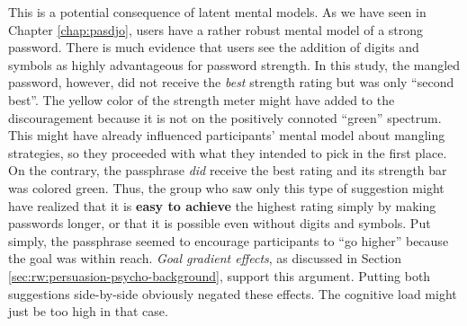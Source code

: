 This is a potential consequence of latent mental models. As we have seen in Chapter \ref{chap:pasdjo}, users have a rather robust mental model of a strong password. There is much evidence that users see the addition of digits and symbols as highly advantageous for password strength. In this study, the mangled password, however, did not receive the \textit{best} strength rating but was only ``second best''. The yellow color of the strength meter might have added to the discouragement because it is not on the positively connoted ``green'' spectrum. This might have already influenced participants' mental model about mangling strategies, so they proceeded with what they intended to pick in the first place. On the contrary, the passphrase \textit{did} receive the best rating and its strength bar was colored green. Thus, the group who saw only this type of suggestion might have realized that it is \textbf{easy to achieve} the highest rating simply by making passwords longer, or that it is possible even without digits and symbols. Put simply, the passphrase seemed to encourage participants to ``go higher'' because the goal was within reach. \textit{Goal gradient effects}, as discussed in Section \ref{sec:rw:persuasion-psycho-background}, support this argument. Putting both suggestions side-by-side obviously negated these effects. The cognitive load might just be too high in that case. 



